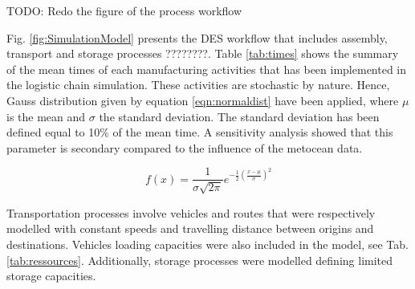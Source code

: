 TODO: Redo the figure of the process workflow

Fig. \ref{fig:SimulationModel} presents the DES workflow that includes assembly, transport and storage processes ????????.
Table \ref{tab:times} shows the summary of the mean times of each manufacturing activities that has been implemented in the logistic chain simulation. These activities are stochastic by nature. Hence, Gauss distribution given by equation \ref{eqn:normaldist} have been applied, where $\mu$ is the mean and $\sigma$ the standard deviation. The standard deviation has been defined equal to 10\% of the mean time. A sensitivity analysis showed that this parameter is secondary compared to the influence of the metocean data. 

\begin{equation}
\label{eqn:normaldist}
f\left( x \right) = \frac{1}{\sigma \sqrt{2 \pi} } e^{- \frac{1}{2} \left( \frac{x - \mu}{\sigma} \right)^{2}}
\end{equation}

Transportation processes involve vehicles and routes that were respectively modelled with constant speeds and travelling distance between origins and destinations. Vehicles loading capacities were also included in the model, see Tab. \ref{tab:ressources}. Additionally, storage processes were modelled defining limited storage capacities.